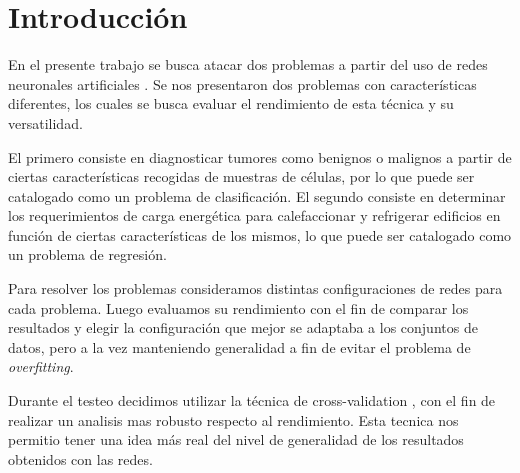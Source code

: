 \documentclass[informe.tex]{subfiles}
\begin{document}
  
  \section{Introducción}

  En el presente trabajo se busca atacar dos problemas a partir del uso de redes neuronales artificiales \cite{hertz}. Se nos presentaron dos problemas con características diferentes, los cuales se busca evaluar el rendimiento de esta técnica y su versatilidad. 
  
  El primero consiste en diagnosticar tumores como benignos o malignos a partir de ciertas características recogidas de muestras de células, por lo que puede ser catalogado como un problema de clasificación. El segundo consiste en determinar los requerimientos de carga energética para calefaccionar y refrigerar edificios en función de ciertas características de los mismos, lo que puede ser catalogado como un problema de regresión.
  
  Para resolver los problemas consideramos distintas configuraciones de redes para cada problema. Luego evaluamos su rendimiento con el fin de comparar los resultados y elegir la configuración que mejor se adaptaba a los conjuntos de datos, pero a la vez manteniendo generalidad a fin de evitar el problema de \emph{overfitting}.
  
  Durante el testeo decidimos utilizar la técnica de cross-validation \cite{haykin}, con el fin de realizar un analisis mas robusto respecto al rendimiento. Esta tecnica nos permitio tener una idea más real del nivel de generalidad de los resultados obtenidos con las redes.
  
\end{document}
